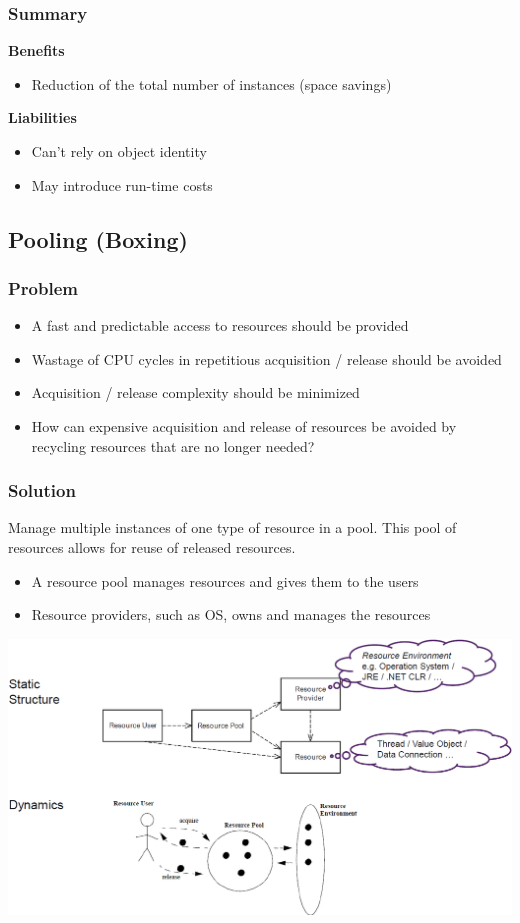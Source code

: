 \subsubsection{Summary}
\textbf{Benefits}
\begin{itemize}
    \item Reduction of the total number of instances (space savings)
\end{itemize}
\textbf{Liabilities}
\begin{itemize}
    \item Can't rely on object identity
    \item May introduce run-time costs
\end{itemize}

\subsection{Pooling (Boxing)}
\subsubsection{Problem}
\begin{itemize}
    \item A fast and predictable access to resources should be provided
    \item Wastage of CPU cycles in repetitious acquisition / release should be avoided
    \item Acquisition / release complexity should be minimized
    \item How can expensive acquisition and release of resources be avoided by recycling resources that are no longer needed?
\end{itemize}
\subsubsection{Solution}
Manage multiple instances of one type of resource in a pool. This pool of resources allows for reuse of released resources.
\begin{itemize}
    \item A resource pool manages resources and gives them to the users
    \item Resource providers, such as OS, owns and manages the resources
\end{itemize}
\includegraphics[width=\linewidth]{./img/pooling.png}
